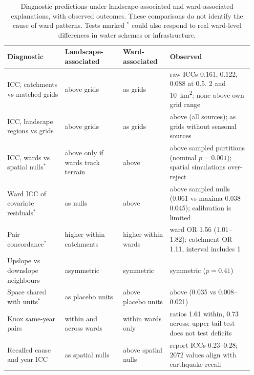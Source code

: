 \documentclass[preprint,12pt,authoryear]{elsarticle}
\begin{document}
\begin{table}[!htbp]
  \centering
  \caption{Diagnostic predictions under landscape-associated and ward-associated explanations, with observed outcomes. These comparisons do not identify the cause of ward patterns. Tests marked $^\ast$ could also respond to real ward-level differences in water schemes or infrastructure.}
  \label{tab:predictions}
  \footnotesize
  \begin{tabularx}{\linewidth}{>{\raggedright\arraybackslash}p{3.4cm}XXX}
    \toprule
    Diagnostic & Landscape-associated & Ward-associated & Observed \\
    \midrule
    ICC, catchments vs matched grids & above grids & as grids & raw ICCs 0.161, 0.122, 0.088 at 0.5, 2 and \SI{10}{\kilo\metre\squared}; none above own grid range \\
    ICC, landscape regions vs grids & above grids & as grids & above (all sources); as grids without seasonal sources \\
    ICC, wards vs spatial nulls$^\ast$ & above only if wards track terrain & above & above sampled partitions (nominal $p = 0.001$); spatial simulations over-reject \\
    Ward ICC of covariate residuals$^\ast$ & as nulls & above & above sampled nulls (0.061 vs maxima 0.038--0.045); calibration is limited \\
    Pair concordance$^\ast$ & higher within catchments & higher within wards & ward OR 1.56 (1.01--1.82); catchment OR 1.11, interval includes 1 \\
    Upslope vs downslope neighbours & asymmetric & symmetric & symmetric ($p = 0.41$) \\
    Space shared with units$^\ast$ & as placebo units & above placebo units & above (0.035 vs 0.008--0.021) \\
    Knox same-year pairs & within and across wards & within wards only & ratios 1.61 within, 0.73 across; upper-tail test does not test deficits \\
    Recalled cause and year ICC & as spatial nulls & above spatial nulls & report ICCs 0.23--0.28; 2072 values align with earthquake recall \\
    \bottomrule
  \end{tabularx}
\end{table}
\end{document}
